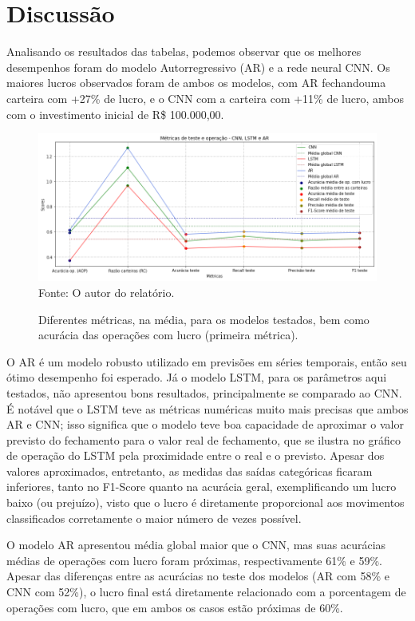 \chapter{Discussão}

\par
Analisando os resultados das tabelas, podemos observar que os melhores desempenhos foram do modelo Autorregressivo (AR) e a rede neural CNN. Os maiores lucros observados foram de ambos os modelos, com AR fechandouma carteira com +27\% de lucro, e o CNN com a carteira com +11\% de lucro, ambos com o investimento inicial de R\$ 100.000,00.

\begin{figure}[hbt]
\centering
\caption{\label{figure:figura1}Diferentes métricas, na média, para os modelos testados, bem como acurácia das operações com lucro (primeira métrica).}
  \includegraphics[scale=0.5]{figures/img1.png}
  Fonte: O autor do relatório.
\end{figure}

\par
O AR é um modelo robusto utilizado em previsões em séries temporais, então seu ótimo desempenho foi esperado. Já o modelo LSTM, para os parâmetros aqui testados, não apresentou bons resultados, principalmente se comparado ao CNN. É notável que o LSTM teve as métricas numéricas muito mais precisas que ambos AR e CNN; isso significa que o modelo teve boa capacidade de aproximar o valor previsto do fechamento para o valor real de fechamento, que se ilustra no gráfico de operação do LSTM pela proximidade entre o real e o previsto. Apesar dos valores aproximados, entretanto, as medidas das saídas categóricas ficaram inferiores, tanto no F1-Score quanto na acurácia geral, exemplificando um lucro baixo (ou prejuízo), visto que o lucro é diretamente proporcional aos movimentos classificados corretamente o maior número de vezes possível.

\par
O modelo AR apresentou média global maior que o CNN, mas suas acurácias médias de operações com lucro foram próximas, respectivamente 61\% e 59\%. Apesar das diferenças entre as acurácias no teste dos modelos (AR com 58\% e CNN com 52\%), o lucro final está diretamente relacionado com a porcentagem de operações com lucro, que em ambos os casos estão próximas de 60\%.

